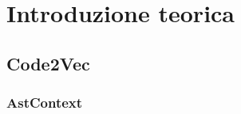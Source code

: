 \chapter{Introduzione teorica}\label{chap:introduzione_teorica}

\section{Code2Vec}\label{sec:code2vec}

\subsection{AstContext}\label{subsec:astcontext}